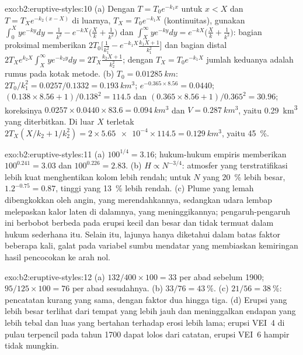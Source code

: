 \begin{solution}{exo:b2:eruptive-styles:10}
(a) Dengan $T = T_0e^{-k_1x}$ untuk $x < X$ dan $T = T_Xe^{-k_2(x - X)}$ di luarnya, $T_X =
T_0e^{-k_1X}$ (kontinuitas), gunakan $\int_0^X ye^{-ky}dy = \frac{1}{k^2} - e^{-kX}\big(\frac{X}{k} +
\frac{1}{k^2}\big)$ dan $\int_X^\infty ye^{-ky}dy = e^{-kX}\big(\frac{X}{k} +
\frac{1}{k^2}\big)$:
bagian proksimal memberikan $2T_0\big[\frac{1}{k_1^2} - e^{-k_1X}\frac{k_1X + 1}{k_1^2}\big]$ dan
bagian distal $2T_Xe^{k_2X}\int_X^\infty ye^{-k_2y}dy = 2T_X\frac{k_2X + 1}{k_2^2}$; dengan $T_X =
T_0e^{-k_1X}$ jumlah keduanya adalah rumus pada kotak metode.
(b) $T_0 = \qty{0.01285}{km}$: $2T_0/k_1^2 = 0.0257/0.1332 = \qty{0.193}{km^3}$;
$e^{-0.365\times8.56} = 0.0440$; $(0.138\times8.56 + 1)/0.138^2 = 114.5$ dan
$(0.365\times8.56 + 1)/0.365^2 = 30.96$; koreksinya $0.0257\times0.0440\times83.6
= \qty{0.094}{km^3}$ dan $V = \qty{0.287}{km^3}$, yaitu \qty{0.29}{km^3} yang diterbitkan.
Di luar $X$ terletak $2T_X(X/k_2 + 1/k_2^2) = 2\times\num{5.65e-4}\times114.5 =
\qty{0.129}{km^3}$, yaitu \qty{45}{\percent}.
\end{solution}

\begin{solution}{exo:b2:eruptive-styles:11}
(a) $100^{1/4} = 3.16$; hukum-hukum empiris memberikan $100^{0.241} = 3.03$ dan
$100^{0.226} = 2.83$. (b) $H \propto N^{-3/4}$: atmosfer yang terstratifikasi lebih kuat
menghentikan kolom lebih rendah; untuk $N$ yang \qty{20}{\percent} lebih besar,
$1.2^{-0.75} = 0.87$, tinggi yang \qty{13}{\percent} lebih rendah. (c) Plume yang lemah
dibengkokkan oleh angin, yang merendahkannya, sedangkan udara lembap melepaskan kalor laten di
dalamnya, yang meninggikannya; pengaruh-pengaruh ini berbobot berbeda pada erupsi kecil dan besar
dan tidak termuat dalam hukum sederhana itu. Selain itu, lajunya hanya diketahui dalam batas
faktor beberapa kali, galat pada variabel sumbu mendatar yang membiaskan
kemiringan hasil pencocokan ke arah nol.
\end{solution}

\begin{solution}{exo:b2:eruptive-styles:12}
(a) $132/400\times100 = 33$ per abad sebelum 1900; $95/125\times100 = 76$ per
abad sesudahnya. (b) $33/76 = \qty{43}{\percent}$. (c) $21/56 = \qty{38}{\percent}$:
pencatatan kurang yang sama, dengan faktor dua hingga tiga. (d) Erupsi yang lebih besar
terlihat dari tempat yang lebih jauh dan meninggalkan endapan yang lebih tebal dan luas yang bertahan terhadap erosi
lebih lama; erupsi VEI~4 di pulau terpencil pada tahun 1700 dapat lolos dari catatan, erupsi
VEI~6 hampir tidak mungkin.
\end{solution}

